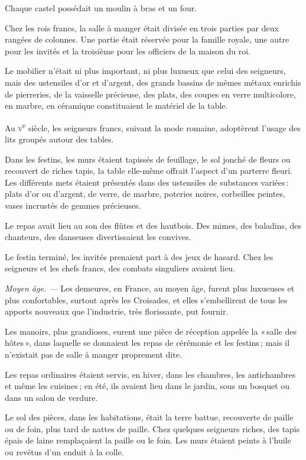 Chaque castel possédait un moulin à bras et un four.

Chez les rois francs, la salle à manger était divisée en trois parties par deux
rangées de colonnes. Une partie était réservée pour la famille royale, une autre
pour les invités et la troisième pour les officiers de la maison du roi.

Le mobilier n'était ni plus important, ni plus luxueux que celui des seigneurs,
mais des ustensiles d'or et d'argent, des grands bassins de mêmes métaux
enrichis de pierreries, de la vaisselle précieuse, des plats, des coupes en
verre multicolore, en marbre, en céramique constituaient le matériel de la
table.

Au \textsc{v}\textsuperscript{e} siècle, les seigneurs francs, suivant la mode
romaine, adoptèrent l'usage des lits groupés autour des tables.

Dans les festins, les murs étaient tapissés de feuillage, le sol jonché de
fleurs ou recouvert de riches tapis, la table elle-même offrait l'aspect d'un
parterre fleuri. Les différents mets étaient présentés dans des ustensiles de
substances variées : plats d'or ou d'argent, de verre, de marbre, poteries
noires, corbeilles peintes, vases incrustés de gemmes précieuses.

Le repas avait lieu au son des flûtes et des hautbois. Des mimes, des baladins,
des chanteurs, des danseuses divertissaient les convives.


Le festin terminé, les invités prenaient part à des jeux de hasard. Chez les
seigneurs et les chefs francs, des combats singuliers avaient lieu.

\sk

\textit{Moyen âge. —} Les demeures, en France, au moyen âge, furent plus
luxueuses et plus confortables, surtout après les Croisades, et elles
s’embellirent de tous les apports nouveaux que l'industrie, très florissante,
put fournir.

Les manoirs, plus grandioses, eurent une pièce de réception appelée la « salle
des hôtes », dans laquelle se donnaient les repas de cérémonie et les festins ;
mais il n'existait pas de salle à manger proprement dite.

Les repas ordinaires étaient servis, en hiver, dans les chambres, les
antichambres et même les cuisines ; en été, ils avaient lieu dans le jardin,
sous un bosquet ou dans un salon de verdure.

Le sol des pièces, dans les habitations, était la terre battue, recouverte de
paille ou de foin, plus tard de nattes de paille. Chez quelques seigneurs
riches, des tapis épais de laine remplaçaient la paille ou le foin. Les murs
étaient peints à l'huile ou revêtus d'un enduit à la colle.

